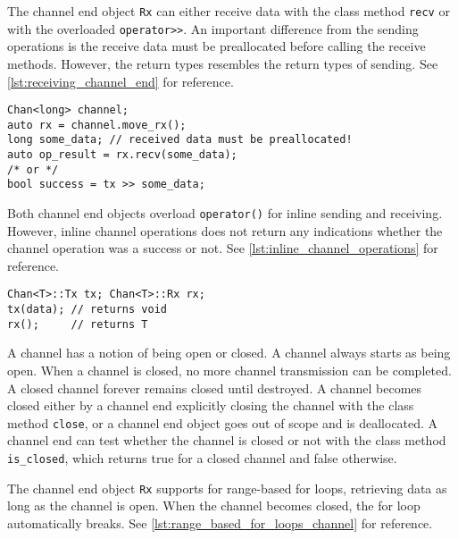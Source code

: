 The channel end object \lstinline[style={CustomC++}]|Rx| can either receive data with the class method \lstinline[style={CustomC++}]|recv| or with the overloaded \lstinline[style={CustomC++}]|operator>>|. An important difference from the sending operations is the receive data must be preallocated before calling the receive methods. However, the return types resembles the return types of sending. See \cref{lst:receiving_channel_end} for reference.

\begin{lstfloat}
\begin{lstlisting}[caption={Receiving on the Rx channel end object.}, label={lst:receiving_channel_end}, style={CustomC++}, xleftmargin={2em}]
Chan<long> channel;
auto rx = channel.move_rx();
long some_data; // received data must be preallocated!
auto op_result = rx.recv(some_data); 
/* or */
bool success = tx >> some_data;
\end{lstlisting}
\end{lstfloat}

Both channel end objects overload \lstinline[style={CustomC++}]|operator()| for inline sending and receiving. However, inline channel operations does not return any indications whether the channel operation was a success or not. See \cref{lst:inline_channel_operations} for reference.

\begin{lstfloat}
\begin{lstlisting}[caption={Inline channel operations.}, label={lst:inline_channel_operations}, style={CustomC++}, xleftmargin={2em}]
Chan<T>::Tx tx; Chan<T>::Rx rx;
tx(data); // returns void
rx();     // returns T
\end{lstlisting}
\end{lstfloat}

A channel has a notion of being open or closed. A channel always starts as being open. When a channel is closed, no more channel transmission can be completed. A closed channel forever remains closed until destroyed. A channel becomes closed either by a channel end explicitly closing the channel with the class method \lstinline[style={CustomC++}]|close|, or a channel end object goes out of scope and is deallocated. A channel end can test whether the channel is closed or not with the class method \lstinline[style={CustomC++}]|is_closed|, which returns true for a closed channel and false otherwise.

The channel end object \lstinline[style={CustomC++}]|Rx| supports for range\hyp{}based for loops, retrieving data as long as the channel is open. When the channel becomes closed, the for loop automatically breaks. See \cref{lst:range_based_for_loops_channel} for reference.

